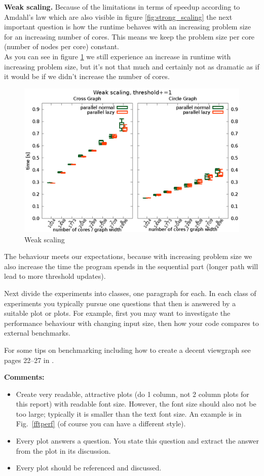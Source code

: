\documentclass[letterpaper]{article}
\newcommand{\mypar}[1]{{\bf #1.}}
\begin{document}
\mypar{Weak scaling}
Because of the limitations in terms of speedup according to Amdahl's law which are also visible in figure \ref{fig:strong_scaling} the next important question is how the runtime behaves with an increasing problem size for an increasing number of cores. This means we keep the problem size per core (number of nodes per core) constant.\\
As you can see in figure \ref{fig:weak_scaling} we still experience an increase in runtime with increasing problem size, but it's not that much and certainly not as dramatic as if it would be if we didn't increase the number of cores.
\begin{figure}[h]\centering
  \includegraphics[scale=0.558]{weak_scaling.eps}
  \caption{Weak scaling\label{fig:weak_scaling}}
\end{figure}
The behaviour meets our expectations, because with increasing problem size we also increase the time the program spends in the sequential part (longer path will lead to more threshold updates).



Next divide the experiments into classes, one paragraph for each. In each class of experiments you typically pursue one questions that then is answered by a suitable plot or plots. For example, first you may want to investigate the performance behaviour with changing input size, then how your code compares to external benchmarks.

For some tips on benchmarking including how to create a decent viewgraph see pages 22--27 in \cite{Pueschel:10}.

{\bf Comments:}
\begin{itemize}
\item Create very readable, attractive plots (do 1 column, not 2 column plots
for this report) with readable font size. However, the font size should also not be too large; typically it is smaller than the text font size.
An example is in Fig.~\ref{fftperf} (of course you can have a different style).
\item Every plot answers a question. You state this question and extract the
answer from the plot in its discussion.
\item Every plot should be referenced and discussed.
\end{itemize}
\end{document}
